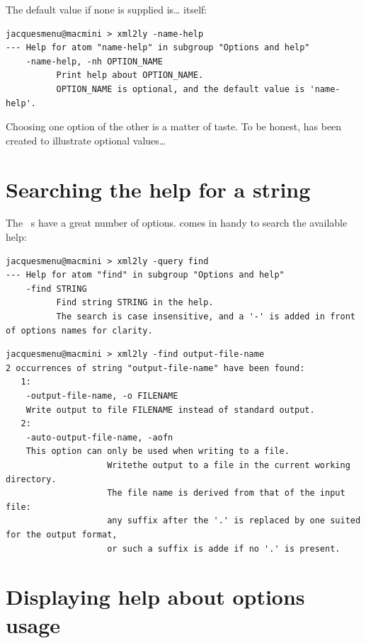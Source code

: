 The default value if none is supplied is\dots {} itself:
\begin{lstlisting}[language=Terminal]
jacquesmenu@macmini > xml2ly -name-help
--- Help for atom "name-help" in subgroup "Options and help"
    -name-help, -nh OPTION_NAME
          Print help about OPTION_NAME.
          OPTION_NAME is optional, and the default value is 'name-help'.
\end{lstlisting}

Choosing one option of the other is a matter of taste. To be honest,  has been created to illustrate optional values\dots


\section{Searching the help for a string}

The \mf\ \service s have a great number of options.  comes in handy to search the available help:
\begin{lstlisting}[language=Terminal]
jacquesmenu@macmini > xml2ly -query find
--- Help for atom "find" in subgroup "Options and help"
    -find STRING
          Find string STRING in the help.
          The search is case insensitive, and a '-' is added in front of options names for clarity.
\end{lstlisting}

\begin{lstlisting}[language=Terminal]
jacquesmenu@macmini > xml2ly -find output-file-name
2 occurrences of string "output-file-name" have been found:
   1:
    -output-file-name, -o FILENAME
    Write output to file FILENAME instead of standard output.
   2:
    -auto-output-file-name, -aofn
    This option can only be used when writing to a file.
                    Writethe output to a file in the current working directory.
                    The file name is derived from that of the input file:
                    any suffix after the '.' is replaced by one suited for the output format,
                    or such a suffix is adde if no '.' is present.
\end{lstlisting}


\section{Displaying help about options usage}

